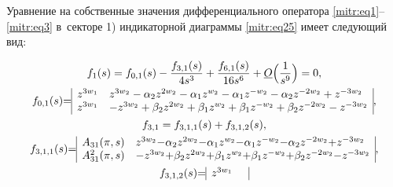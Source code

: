 \begin{lemma}[5]Уравнение на собственные значения дифференциального оператора \eqref{mitr:eq1}--\eqref{mitr:eq3} в~секторе  {\rm  1)} индикаторной диаграммы  \eqref{mitr:eq25} имеет следующий вид\/{\rm:}

\begin{gather}

\label{mitr:eq30}

f_1(s)=f_{0,1}(s)-\frac{f_{3,1}(s)}{4s^3}+\frac{f_{6,1}(s)}{16s^6}+\underline O\Bigl(\frac1{s^9}\Bigr)=0,\\

\label{mitr:eq31}

f_{0,1}(s){=}

\begin{array}{|ll|}

z^{3w_1} &

z^{3w_2}-\alpha_2z^{2w_2}-\alpha_1z^{w_2}-\alpha_1z^{-w_2}-\alpha_2 z^{-2w_2}+z^{-3w_2}\\

z^{3w_1}

&{-}z^{3w_2}+\beta_2z^{2w_2}+\beta_1z^{w_2}+\beta_1z^{-w_2}+\beta_2 z^{-2w_2}-z^{-3w_2}

\end{array},\\

\label{mitr:eq34}

f_{3,1}=f_{3,1,1}(s)+f_{3,1,2}(s),\\

\label{mitr:eq34}

f_{3,1,1}(s){=}

\begin{array}{|ll|}

A_{31}(\pi,s)

&z^{3w_2}{-}\alpha_2z^{2w_2}{-}\alpha_1z^{w_2}{-}\alpha_1z^{-w_2}{-}\alpha_2 z^{-2w_2}{+}z^{-3w_2}\\

A^2_{31}(\pi,s)

&{-}z^{3w_2}{+}\beta_2z^{2w_2}{+}\beta_1z^{w_2}{+}\beta_1z^{-w_2}{+}\beta_2 z^{-2w_2}{-}z^{-3w_2}

\end{array},\\

\label{mitr:eq34}

f_{3,1,2}(s){=}

\begin{array}{|lr|}

z^{3w_1} &


\end{array}
\end{gather}
\end{lemma}
